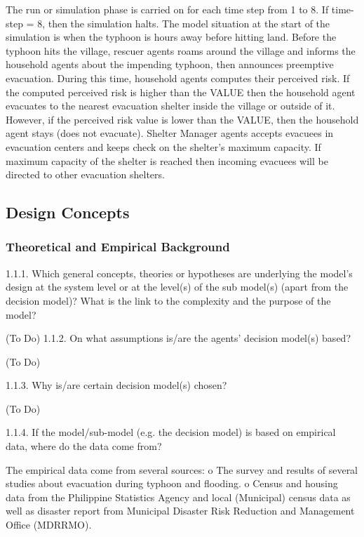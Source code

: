\documentclass[runningheads]{llncs}
\begin{document}
The run or simulation phase is carried on for each time step from 1 to 8. If time-step = 8, then the simulation halts. The model situation at the start of the simulation is when the typhoon is hours away before hitting land. Before the typhoon hits the village, rescuer agents roams around the village and informs the household agents about the impending typhoon, then announces preemptive evacuation.  During this time, household agents computes their perceived risk. If the computed perceived risk is higher than the VALUE then the household agent evacuates to the nearest evacuation shelter inside the village or outside of it. However, if the perceived risk value is lower than the VALUE, then the household agent stays (does not evacuate). Shelter Manager agents accepts evacuees in evacuation centers and keeps check on the shelter’s maximum capacity. If maximum capacity of the shelter is reached then incoming evacuees will be directed to other evacuation shelters.

\subsection{Design Concepts}
\subsubsection{Theoretical and Empirical Background}
1.1.1.	Which general concepts, theories or hypotheses are underlying the model’s design at the system level or at the level(s) of the sub model(s) (apart from the decision model)? What is the link to the complexity and the purpose of the model?

(To Do)
1.1.2.	On what assumptions is/are the agents’ decision model(s) based?

(To Do)

1.1.3.	Why is/are certain decision model(s) chosen?

(To Do)

1.1.4.	If the model/sub-model (e.g. the decision model) is based on empirical data, where do the data come from?

The empirical data come from several sources:
o	The survey and results of several studies about evacuation during typhoon and flooding.
o	Census and housing data from the Philippine Statistics Agency and local (Municipal) census data as well as disaster report from Municipal Disaster Risk Reduction and Management Office (MDRRMO).  
\end{document}
